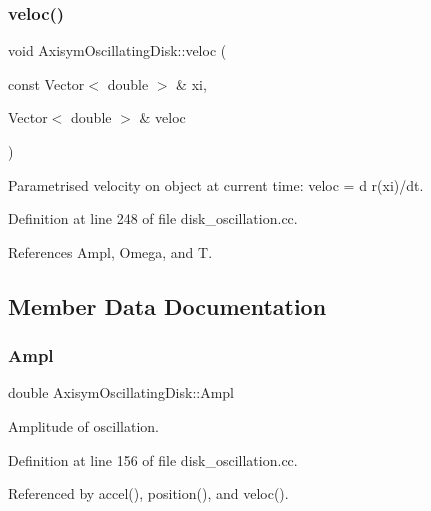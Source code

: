 \subsubsection{\texorpdfstring{veloc()}{veloc()}}
{\footnotesize\ttfamily void Axisym\+Oscillating\+Disk\+::veloc (\begin{DoxyParamCaption}\item[{const Vector$<$ double $>$ \&}]{xi,  }\item[{Vector$<$ double $>$ \&}]{veloc }\end{DoxyParamCaption})}



Parametrised velocity on object at current time\+: veloc = d r(xi)/dt. 



Definition at line 248 of file disk\+\_\+oscillation.\+cc.



References Ampl, Omega, and T.



\subsection{Member Data Documentation}
\mbox{\label{classAxisymOscillatingDisk_a9b73de59d11877c96bc85ad52fe7c407}} 
\subsubsection{\texorpdfstring{Ampl}{Ampl}}
{\footnotesize\ttfamily double Axisym\+Oscillating\+Disk\+::\+Ampl\hspace{0.3cm}{\ttfamily [private]}}



Amplitude of oscillation. 



Definition at line 156 of file disk\+\_\+oscillation.\+cc.



Referenced by accel(), position(), and veloc().

\mbox{\label{classAxisymOscillatingDisk_abe977725f5fc04c5bfa8466ecdef0956}} 
